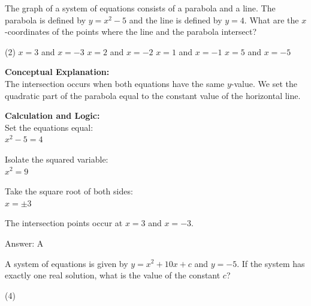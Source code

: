 \documentclass[11pt,paper=a4,answers]{exam}
\begin{document}
\begin{questions}
\question
The graph of a system of equations consists of a parabola and a line. The parabola is defined by $y = x^2 - 5$ and the line is defined by $y = 4$. What are the $x$-coordinates of the points where the line and the parabola intersect?
\begin{tasks}(2)
    \task $x = 3$ and $x = -3$
    \task $x = 2$ and $x = -2$
    \task $x = 1$ and $x = -1$
    \task $x = 5$ and $x = -5$
\end{tasks}

\begin{solution}
\textbf{Conceptual Explanation:} \\
The intersection occurs when both equations have the same $y$-value. We set the quadratic part of the parabola equal to the constant value of the horizontal line.

\vspace{20pt}

\textbf{Calculation and Logic:} \\
Set the equations equal: \\
$x^2 - 5 = 4$

\vspace{10pt}

Isolate the squared variable: \\
$x^2 = 9$

\vspace{10pt}

Take the square root of both sides: \\
$x = \pm 3$

\vspace{10pt}

The intersection points occur at $x = 3$ and $x = -3$.

\vspace{25pt}

Answer: \colorbox{yellow!100}{A}
\end{solution}

\vspace{40pt}

\question
A system of equations is given by $y = x^2 + 10x + c$ and $y = -5$. If the system has exactly one real solution, what is the value of the constant $c$?
\begin{tasks}(4)
\end{tasks}


\end{questions}
\end{document}
